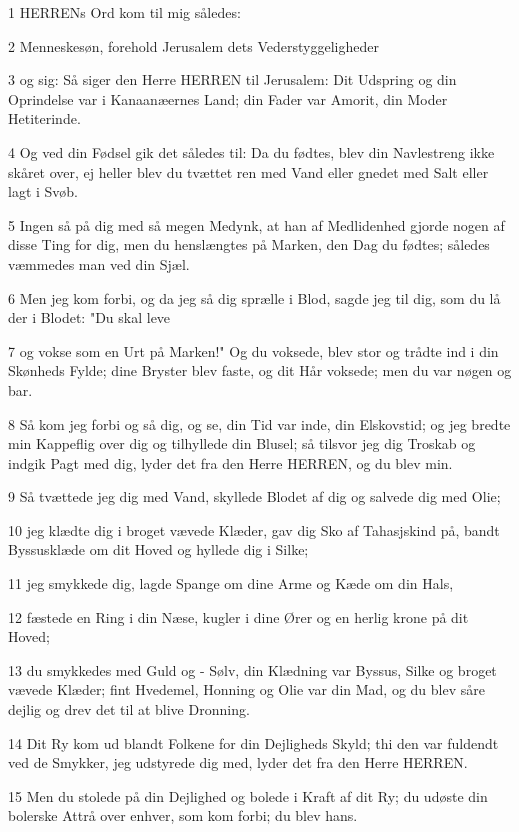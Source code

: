 \par 1 HERRENs Ord kom til mig således:
\par 2 Menneskesøn, forehold Jerusalem dets Vederstyggeligheder
\par 3 og sig: Så siger den Herre HERREN til Jerusalem: Dit Udspring og din Oprindelse var i Kanaanæernes Land; din Fader var Amorit, din Moder Hetiterinde.
\par 4 Og ved din Fødsel gik det således til: Da du fødtes, blev din Navlestreng ikke skåret over, ej heller blev du tvættet ren med Vand eller gnedet med Salt eller lagt i Svøb.
\par 5 Ingen så på dig med så megen Medynk, at han af Medlidenhed gjorde nogen af disse Ting for dig, men du henslængtes på Marken, den Dag du fødtes; således væmmedes man ved din Sjæl.
\par 6 Men jeg kom forbi, og da jeg så dig sprælle i Blod, sagde jeg til dig, som du lå der i Blodet: "Du skal leve
\par 7 og vokse som en Urt på Marken!" Og du voksede, blev stor og trådte ind i din Skønheds Fylde; dine Bryster blev faste, og dit Hår voksede; men du var nøgen og bar.
\par 8 Så kom jeg forbi og så dig, og se, din Tid var inde, din Elskovstid; og jeg bredte min Kappeflig over dig og tilhyllede din Blusel; så tilsvor jeg dig Troskab og indgik Pagt med dig, lyder det fra den Herre HERREN, og du blev min.
\par 9 Så tvættede jeg dig med Vand, skyllede Blodet af dig og salvede dig med Olie;
\par 10 jeg klædte dig i broget vævede Klæder, gav dig Sko af Tahasjskind på, bandt Byssusklæde om dit Hoved og hyllede dig i Silke;
\par 11 jeg smykkede dig, lagde Spange om dine Arme og Kæde om din Hals,
\par 12 fæstede en Ring i din Næse, kugler i dine Ører og en herlig krone på dit Hoved;
\par 13 du smykkedes med Guld og - Sølv, din Klædning var Byssus, Silke og broget vævede Klæder; fint Hvedemel, Honning og Olie var din Mad, og du blev såre dejlig og drev det til at blive Dronning.
\par 14 Dit Ry kom ud blandt Folkene for din Dejligheds Skyld; thi den var fuldendt ved de Smykker, jeg udstyrede dig med, lyder det fra den Herre HERREN.
\par 15 Men du stolede på din Dejlighed og bolede i Kraft af dit Ry; du udøste din bolerske Attrå over enhver, som kom forbi; du blev hans.
